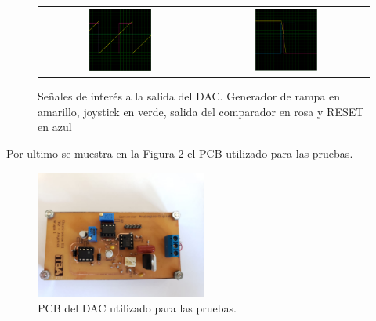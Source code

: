 \begin{figure}[H]
    
    \centering
    \begin{tabular}{c c}
        \includegraphics[width=0.4\textwidth]{../EJ8/Recursos/OSC_DAC} &
        \includegraphics[width=0.4\textwidth]{../EJ8/Recursos/OSC_DAC_RST}
    \end{tabular}
    \caption{Se\~nales de inter\'es a la salida del DAC. Generador de rampa en amarillo, joystick en verde, salida del comparador en rosa y RESET en azul }
    \label{fig:DAC}
\end{figure}

Por ultimo se muestra en la Figura \ref{fig:PCB_ANALOG} el PCB utilizado para las pruebas.
\begin{figure}[H]
    \centering
    \includegraphics[width=0.5\textwidth]{../EJ8/Recursos/ANALOG_PCB}
    \caption{PCB del DAC utilizado para las pruebas.}
    \label{fig:PCB_ANALOG}
\end{figure}


